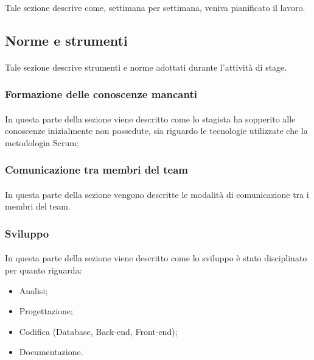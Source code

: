 \documentclass[
article,
10pt, %
oneside, %
BCOR5mm, %
]{scrartcl}
\begin{document}
\paragraph{} Tale sezione descrive come, settimana per settimana, veniva
pianificato il lavoro.

\subsection{Norme e strumenti}
\paragraph{} Tale sezione descrive strumenti e norme adottati durante
l'attività di stage.

\subsubsection{Formazione delle conoscenze mancanti}
\paragraph{} In questa parte della sezione viene descritto come lo stagista ha
sopperito alle conoscenze inizialmente non possedute, sia riguardo le
tecnologie utilizzate che la metodologia Scrum;

\subsubsection{Comunicazione tra membri del team}
\paragraph{} In questa parte della sezione vengono descritte le modalità di
comunicazione tra i membri del team.

\subsubsection{Sviluppo}
\paragraph{} In questa parte della sezione viene descritto come lo sviluppo è
stato disciplinato per quanto riguarda:
\begin{itemize}
\item Analisi;
\item Progettazione;
\item Codifica (Database, Back-end, Front-end);
\item Documentazione.
\end{itemize}
\end{document}
